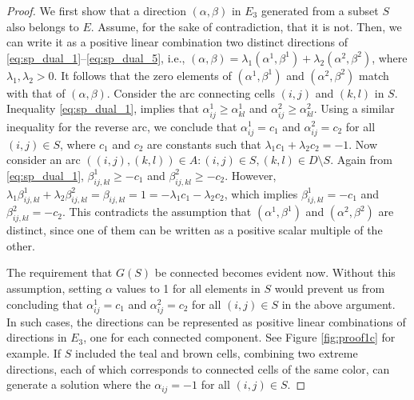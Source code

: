 \documentclass[10pt]{article}
\newcommand{\validdriveset}{D}
\newcommand{\grid}{G}
\newcommand{\gridarcset}{A}
\theoremstyle{definition}
\begin{document}
\begin{proof}
We first show that a direction $(\alpha, \beta)$ in $E_3$ generated from a subset $S$ also belongs to $E$. Assume, for the sake of contradiction, that it is not. Then, we can write it as a positive linear combination two distinct directions of \eqref{eq:sp_dual_1}--\eqref{eq:sp_dual_5}, i.e., $(\alpha, \beta) = \lambda_1 (\alpha^1, \beta^1) + \lambda_2 (\alpha^2, \beta^2)$, where $\lambda_1, \lambda_2 > 0$. It follows that the zero elements of $(\alpha^1, \beta^1)$ and $(\alpha^2, \beta^2)$ match with that of $(\alpha, \beta)$. Consider the arc connecting cells $(i, j)$ and $(k, l)$ in $S$. Inequality \eqref{eq:sp_dual_1}, implies that $\alpha_{ij}^1 \geq \alpha_{kl}^1$ and $\alpha_{ij}^2 \geq \alpha_{kl}^2$. Using a similar inequality for the reverse arc, we conclude that $\alpha_{ij}^1=c_1$ and $\alpha_{ij}^2=c_2$ for all $(i,j) \in S$, where $c_1$ and $c_2$ are constants such that $\lambda_1 c_1 + \lambda_2 c_2 = -1$. Now consider an arc $((i,j), (k, l)) \in \gridarcset : (i, j) \in S, (k, l) \in \validdriveset \setminus S$. Again from \eqref{eq:sp_dual_1}, $\beta_{ij, kl}^1 \geq -c_1$ and $\beta_{ij, kl}^2 \geq -c_2$. However, $\lambda_1 \beta_{ij, kl}^1 + \lambda_2 \beta_{ij, kl}^2 = \beta_{ij, kl} = 1 = - \lambda_1 c_1 - \lambda_2 c_2$, which implies $\beta_{ij, kl}^1 = -c_1$ and $\beta_{ij, kl}^2 = -c_2$. This contradicts the assumption that $(\alpha^1, \beta^1)$ and $(\alpha^2, \beta^2)$ are distinct, since one of them can be written as a positive scalar multiple of the other. 

The requirement that $\grid(S)$ be connected becomes evident now. Without this assumption, setting $\alpha$ values to 1 for all elements in $S$ would prevent us from concluding that $\alpha_{ij}^1=c_1$ and $\alpha_{ij}^2=c_2$ for all $(i,j) \in S$ in the above argument.  In such cases, the directions can be represented as positive linear combinations of directions in $E_3$, one for each connected component. See Figure \ref{fig:proof1c} for example. If $S$ included the teal and brown cells, combining two extreme directions, each of which corresponds to connected cells of the same color, can generate a solution where the $\alpha_{ij}=-1$ for all $(i,j) \in S$. 


\end{proof}
\end{document}
